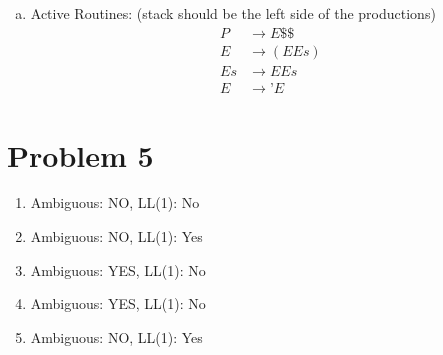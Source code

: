 \documentclass{article}
\def\math#1{$#1$}
\begin{document}
\begin{enumerate}[a)]
    \item Active Routines: (stack should be the left side of the productions)
        \begin{equation}
            \begin{split}
                P &\xrightarrow{} E\$\$ \\
                E &\xrightarrow{} (EEs)\\
                Es &\xrightarrow{} E Es \\
                E &\xrightarrow{} \texttt{'}E 
            \end{split}
        \end{equation}
\end{enumerate}


\clearpage

\section{Problem 5}

\begin{enumerate}[1)]
    \item Ambiguous: NO, LL(1): No
    \item Ambiguous: NO, LL(1): Yes
    \item Ambiguous: YES, LL(1): No %
    \item Ambiguous: YES, LL(1): No
    \item Ambiguous: NO, LL(1): Yes
\end{enumerate}
\end{document}
